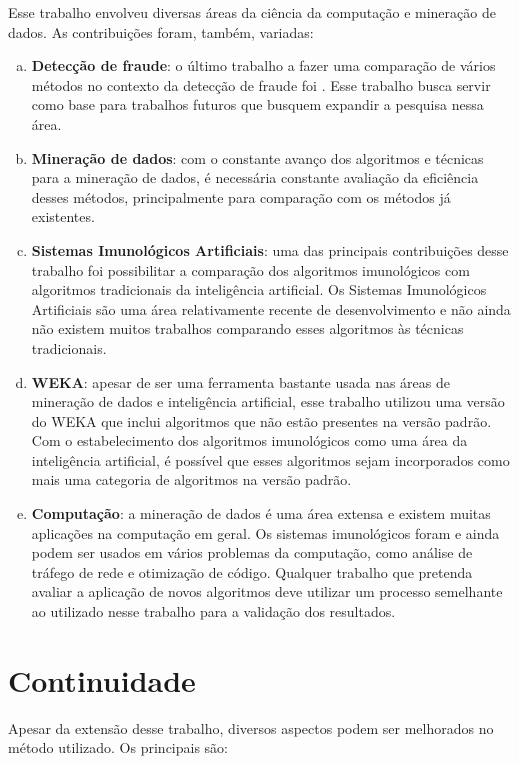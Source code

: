 Esse trabalho envolveu diversas áreas da ciência da computação e mineração de dados. As contribuições foram, também, variadas:

\begin{enumerate}[a)]
    \item \textbf{Detecção de fraude}: o último trabalho a fazer uma comparação de vários métodos no contexto da detecção de fraude foi \citet{Phua2010}. Esse trabalho busca servir como base para trabalhos futuros que busquem expandir a pesquisa nessa área.
    \item \textbf{Mineração de dados}: com o constante avanço dos algoritmos e técnicas para a mineração de dados, é necessária constante avaliação da eficiência desses métodos, principalmente para comparação com os métodos já existentes.
    \item \textbf{Sistemas Imunológicos Artificiais}: uma das principais contribuições desse trabalho foi possibilitar a comparação dos algoritmos imunológicos com algoritmos tradicionais da inteligência artificial. Os Sistemas Imunológicos Artificiais são uma área relativamente recente de desenvolvimento e não ainda não existem muitos trabalhos comparando esses algoritmos às técnicas tradicionais.
    \item \textbf{WEKA}: apesar de ser uma ferramenta bastante usada nas áreas de mineração de dados e inteligência artificial, esse trabalho utilizou uma versão do WEKA que inclui algoritmos que não estão presentes na versão padrão. Com o estabelecimento dos algoritmos imunológicos como uma área da inteligência artificial, é possível que esses algoritmos sejam incorporados como mais uma categoria de algoritmos na versão padrão.
    \item \textbf{Computação}: a mineração de dados é uma área extensa e existem muitas aplicações na computação em geral. Os sistemas imunológicos foram e ainda podem ser usados em vários problemas da computação, como análise de tráfego de rede e otimização de código. Qualquer trabalho que pretenda avaliar a aplicação de novos algoritmos deve utilizar um processo semelhante ao utilizado nesse trabalho para a validação dos resultados.
\end{enumerate}

\section{Continuidade}

Apesar da extensão desse trabalho, diversos aspectos podem ser melhorados no método utilizado. Os principais são:

